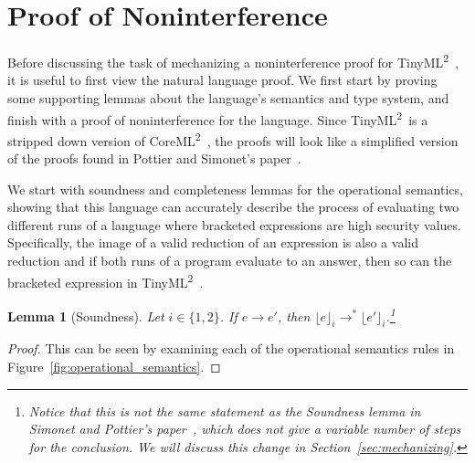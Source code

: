 \documentclass[a4paper,twocolumn]{article}
\newcommand{\langName}[0]{TinyML\textsuperscript{2}~}
\newcommand{\origLang}[0]{CoreML\textsuperscript{2}~}
\newcommand{\lift}[1]{\lfloor #1 \rfloor}
\theoremstyle{plain}
\newtheorem{lemma}{Lemma}
\theoremstyle{definition}
\begin{document}
\section{Proof of Noninterference}
\label{sec:proof}

Before discussing the task of mechanizing a noninterference proof for \langName,
it is useful to first view the natural language proof.  We first start by proving some supporting lemmas about the language's
semantics and type system, and finish with a proof of noninterference for the
language.  Since \langName is a stripped down version of \origLang, the proofs
will look like a simplified version of the proofs found in Pottier and Simonet's
paper~\cite{InfoFlowML}.

We start with soundness and completeness lemmas for the operational semantics,
showing that this language can accurately describe the process of evaluating two
different runs of a language where bracketed expressions are high security
values.  Specifically, the image of a valid reduction of an expression is also a
valid reduction and if both runs of a program evaluate to an answer, then so can
the bracketed expression in \langName.

\begin{lemma}[Soundness]
  \label{lem:soundness}
  Let $i \in \{1, 2\}$. If $e \to e'$, then $\lift{e}_i \to^*
  \lift{e'}_i$.\footnote{Notice that this is not the same statement as the
  Soundness lemma in Simonet and Pottier's paper~\cite{InfoFlowML}, which does
  not give a variable number of steps for the conclusion.  We will discuss this
  change in Section~\ref{sec:mechanizing}.}
\end{lemma}
\begin{proof}
  This can be seen by examining each of the operational semantics rules in
  Figure~\ref{fig:operational_semantics}.
\end{proof}
\end{document}
